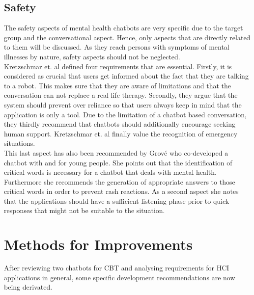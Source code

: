 \documentclass[sigconf, nonacm]{acmart}
\begin{document}
\subsection{Safety}
The safety aspects of mental health chatbots are very specific due to the target group and the conversational aspect. Hence, only aspects that are directly related to them will be discussed.
As they reach persons with symptoms of mental illnesses by nature, safety aspects should not be neglected. 
\\
Kretzschmar et. al \cite{Kretzschmar2019} defined four requirements that are essential. Firstly, it is considered as crucial that users get informed about the fact that they are talking to a robot. This makes sure that they are aware of limitations and that the conversation can not replace a real life therapy.
Secondly, they argue that the system should prevent over reliance so that users always keep in mind that the application is only a tool. 
Due to the limitation of a chatbot based conversation, they thirdly recommend that chatbots should additionally encourage seeking human support.
Kretzschmar et. al finally value the recognition of emergency situations.
\\
This last aspect has also been recommended by Grové \cite{Grove2021} who co-developed a chatbot with and for young people. She points out that the identification of critical words is necessary for a chatbot that deals with mental health.
Furthermore she recommends the generation of appropriate answers to those critical words in order to prevent rash reactions.
As a second aspect she notes that the applications should have a sufficient listening phase prior to quick responses that might not be suitable to the situation. 


\section{Methods for Improvements}
After reviewing two chatbots for CBT and analysing requirements for HCI applications in general, some specific development recommendations are now being derivated. 
\end{document}

